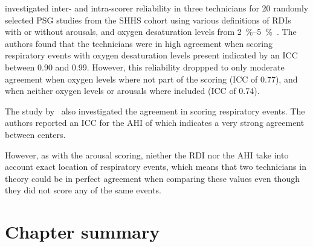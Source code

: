             \citeauthor{Whitney1998} investigated inter- and intra-scorer reliability in three technicians for 20 randomly selected \ac{PSG} studies from the \ac{SHHS} cohort using various definitions of \acp{RDI} with or without arousals, and oxygen desaturation levels from \SIrange{2}{5}{\percent}~\cite{Whitney1998}.
            The authors found that the technicians were in high agreement when scoring respiratory events with oxygen desaturation levels present indicated by an \ac{ICC} between 0.90 and 0.99.
            However, this reliability droppped to only moderate agreement when oxygen levels where not part of the scoring (\ac{ICC} of 0.77), and when neither oxygen levels or arousals where included (\ac{ICC} of 0.74).
            
            The study by~\citeauthor{Magalang2013} also investigated the agreement in scoring respiratory events.
            The authors reported an \ac{ICC} for the \ac{AHI} of  which indicates a very strong agreement between centers.
            
            However, as with the arousal scoring, niether the \ac{RDI} nor the \ac{AHI} take into account exact location of respiratory events, which means that two technicians in theory could be in perfect agreement when comparing these values even though they did not score any of the same events.
            
            \citeauthor{Whitney1998}\citeyear{Whitney1998}\cite{Whitney1998}
            
            \citeauthor{Magalang2013}\cite{Magalang2013}
            
            \citeauthor{Rosenberg2014a}\cite{Rosenberg2014a}
        
    \section{Chapter summary}
